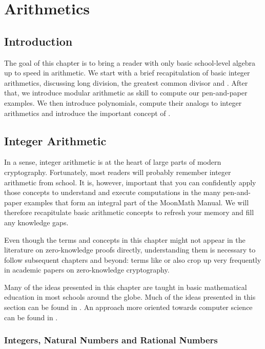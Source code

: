 \chapter{Arithmetics}\label{chap:arithmetic}\label{chap:arithmetics}

\section{Introduction}

The goal of this chapter is to bring a reader with only basic school-level algebra up to speed in arithmetic. We start with a brief recapitulation of basic integer arithmetics, discussing long division, the greatest common divisor and . After that, we introduce modular arithmetic as  skill to compute our pen-and-paper examples. We then introduce polynomials, compute their analogs to integer arithmetics and introduce the important concept of .

\section{Integer Arithmetic}
\label{integer_arithmetic}
In a sense, integer arithmetic is at the heart of large parts of modern cryptography. Fortunately, most readers will probably remember integer arithmetic from school. It is, however, important that you can confidently apply those concepts to understand and execute computations in the many pen-and-paper examples that form an integral part of the MoonMath Manual. We will therefore recapitulate basic arithmetic concepts to refresh your memory and fill any knowledge gaps.

Even though the terms and concepts in this chapter might not appear in the literature on zero-knowledge proofs directly, understanding them is necessary to follow subsequent chapters and beyond: terms like  or  also crop up very frequently in academic papers on zero-knowledge cryptography.

Many of the ideas presented in this chapter are taught in basic mathematical education in most schools around the globe. Much of the ideas presented in this section can be found in \cite{wu-1}. An approach more oriented towards computer science can be found in \cite{mignotte-1992}.

\subsection{Integers, Natural Numbers and Rational Numbers}

